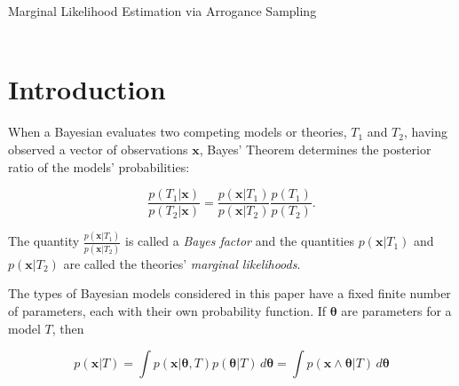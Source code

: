 \documentclass[letterpaper,12pt]{article}
\newcommand{\bx}{\boldsymbol x}
\newcommand{\btheta}{\boldsymbol \theta}
\begin{document}
\thispagestyle{plain}\begin{center}{\LARGE Marginal Likelihood Estimation via Arrogance Sampling }\\

\vspace{1em}{\large By  Benedict Escoto }\\

\end{center}
\begin{abstract}
  This paper describes a method for estimating the marginal likelihood
  or Bayes factors of Bayesian models using non-parametric importance
  sampling (``arrogance sampling'').  This method can also be used to
  compute the normalizing constant of probability distributions.
  Because the required inputs are samples from the distribution to be
  normalized and the scaled density at those samples, this method may
  be a convenient replacement for the harmonic mean estimator.  The
  method has been implemented in the open source R package
  \texttt{margLikArrogance}.
\end{abstract}

\section{Introduction}

When a Bayesian evaluates two competing models or theories, $T_1$ and
$T_2$, having observed a vector of observations $\bx$, Bayes' Theorem
determines the posterior ratio of the models' probabilities:

\begin{equation} \label{bayes factor}
  \frac{p(T_1|\bx)}{p(T_2|\bx)} = \frac{p(\bx|T_1)}{p(\bx|T_2)} \frac{p(T_1)}{p(T_2)}.
  \end{equation}

\noindent The quantity $\frac{p(\bx|T_1)}{p(\bx|T_2)}$ is called a
\emph{Bayes factor} and the quantities $p(\bx|T_1)$ and $p(\bx|T_2)$
are called the theories' \emph{marginal likelihoods}.

The types of Bayesian models considered in this paper have a fixed
finite number of parameters, each with their own probability function.
If $\btheta$ are parameters for a model $T$, then

\begin{equation} \label{main integral}
  p(\bx|T) = \int p(\bx|\btheta, T) p(\btheta|T) \, d\btheta
  = \int p(\bx \wedge \btheta|T) \, d\btheta
\end{equation}
\end{document}
